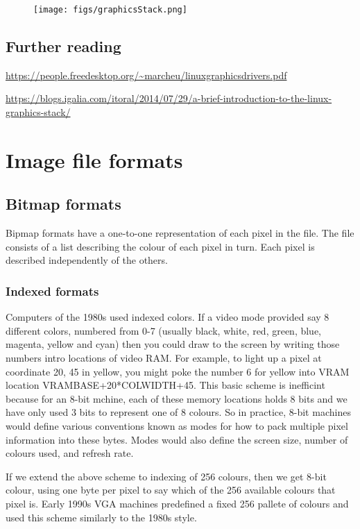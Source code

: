 \documentclass[oneside,english]{scrbook}
\begin{document}
\begin{figure}
	\caption{}
	\texttt{[image: figs/graphicsStack.png]}
\end{figure}

\section{Further reading}
\url{https://people.freedesktop.org/~marcheu/linuxgraphicsdrivers.pdf}

\url{https://blogs.igalia.com/itoral/2014/07/29/a-brief-introduction-to-the-linux-graphics-stack/}



\chapter{Image file formats}

\section{Bitmap formats}

Bipmap formats have a one-to-one representation of each pixel in the file. The file consists of a list describing the colour of each pixel in turn.  Each pixel is described independently of the others.


\subsection{Indexed formats}
Computers of the 1980s used indexed colors.   If a video mode provided say 8 different colors, numbered from 0-7 (usually black, white, red, green, blue, magenta, yellow and cyan) then you could draw to the screen by writing those numbers intro locations of video RAM.  For example, to light up a pixel at coordinate 20, 45 in yellow, you might poke the number 6 for yellow into VRAM location VRAMBASE+20*COLWIDTH+45.  This basic scheme is inefficint because for an 8-bit mchine, each of these memory locations holds 8 bits and we have only used 3 bits to represent one of 8 colours.  So in practice, 8-bit machines would define various conventions known as modes for how to pack multiple pixel information into these bytes.  Modes would also define the screen size, number of colours used, and refresh rate.

If we extend the above scheme to indexing of 256 colours, then we get 8-bit colour, using one byte per pixel to say which of the 256 available colours that pixel is.  Early 1990s VGA machines predefined a fixed 256 pallete of colours and used this scheme similarly to the 1980s style.    
\end{document}
